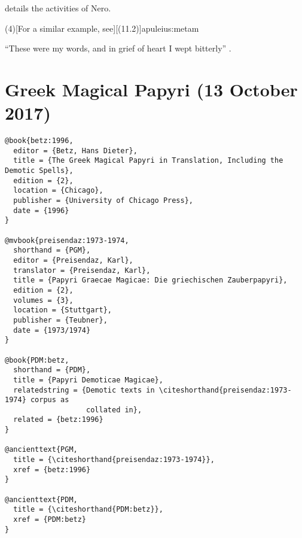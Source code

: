 \documentclass[a4paper]{article}
\renewcommand\footnote[1]{##1}%
\begin{document}
\begin{verbcite}
  \cite[(15)]{tacitus:ann} details the activities of Nero.
\end{verbcite}
\examplecite(4)[For a similar example, see][(11.2)]{apuleius:metam}
\begin{verbcite}
  “These were my words, and in grief of heart I wept bitterly”
  .
\end{verbcite}
\begin{verbcite}
  \nocite{aristotle:metaphysics:2, augustine:cityofgod:1,
    aristotle:metaphysics, augustine:cityofgod, augustine:selectletters,
    aristotle:poetics, longinus:sublime, demetrius:style}
\end{verbcite}
\nocite{aristotle:poetics:book:short}
\exampleancientsources
\examplesecondarysources
\examplebibliography
{}

\section{Greek Magical Papyri (13 October 2017)}

\begin{verbatim}
@book{betz:1996,
  editor = {Betz, Hans Dieter},
  title = {The Greek Magical Papyri in Translation, Including the Demotic Spells},
  edition = {2},
  location = {Chicago},
  publisher = {University of Chicago Press},
  date = {1996}
}

@mvbook{preisendaz:1973-1974,
  shorthand = {PGM},
  editor = {Preisendaz, Karl},
  translator = {Preisendaz, Karl},
  title = {Papyri Graecae Magicae: Die griechischen Zauberpapyri},
  edition = {2},
  volumes = {3},
  location = {Stuttgart},
  publisher = {Teubner},
  date = {1973/1974}
}

@book{PDM:betz,
  shorthand = {PDM},
  title = {Papyri Demoticae Magicae},
  relatedstring = {Demotic texts in \citeshorthand{preisendaz:1973-1974} corpus as
                   collated in},
  related = {betz:1996}
}

@ancienttext{PGM,
  title = {\citeshorthand{preisendaz:1973-1974}},
  xref = {betz:1996}
}

@ancienttext{PDM,
  title = {\citeshorthand{PDM:betz}},
  xref = {PDM:betz}
}
\end{verbatim}
\end{document}
